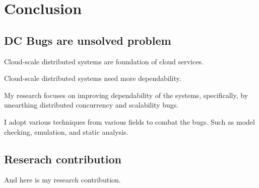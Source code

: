 
\section{Conclusion}

\subsection{DC Bugs are unsolved problem}

Cloud-scale distributed systems are foundation of cloud services.


Cloud-scale distributed systems need more dependability.

My research focuses on improving dependability of the systems, specifically, by
unearthing distributed concurrency and scalability bugs.

I adopt various techniques from various fields to combat the bugs. Such as model
checking, emulation, and static analysis.

\subsection{Reserach contribution}

And here is my research contribution.

%
%
%
%
%
